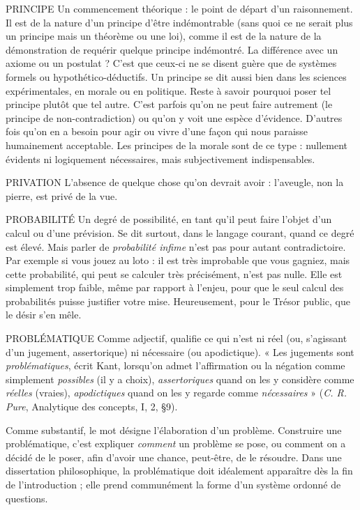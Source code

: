 PRINCIPE Un commencement théorique : le point de départ d’un raisonnement.
Il est de la nature d’un principe d’être indémontrable
(sans quoi ce ne serait plus un principe mais un théorème ou une loi), comme
il est de la nature de la démonstration de requérir quelque principe indémontré.
La différence avec un axiome ou un postulat ? C’est que ceux-ci ne se
disent guère que de systèmes formels ou hypothético-déductifs. Un principe se
dit aussi bien dans les sciences expérimentales, en morale ou en politique. Reste
à savoir pourquoi poser tel principe plutôt que tel autre. C’est parfois qu’on ne
peut faire autrement (le principe de non-contradiction) ou qu’on y voit une
espèce d’évidence. D’autres fois qu’on en a besoin pour agir ou vivre d’une
façon qui nous paraisse humainement acceptable. Les principes de la morale
sont de ce type : nullement évidents ni logiquement nécessaires, mais subjectivement
indispensables.

PRIVATION L'absence de quelque chose qu’on devrait avoir : l’aveugle,
non la pierre, est privé de la vue.

PROBABILITÉ Un degré de possibilité, en tant qu’il peut faire l’objet d’un
calcul ou d’une prévision. Se dit surtout, dans le langage
courant, quand ce degré est élevé. Mais parler de {\it probabilité infime} n’est pas
pour autant contradictoire. Par exemple si vous jouez au loto : il est très improbable
que vous gagniez, mais cette probabilité, qui peut se calculer très précisément,
n’est pas nulle. Elle est simplement trop faible, même par rapport à
l'enjeu, pour que le seul calcul des probabilités puisse justifier votre mise. Heureusement,
pour le Trésor public, que le désir s’en mêle.

PROBLÉMATIQUE Comme adjectif, qualifie ce qui n’est ni réel (ou,
s'agissant d’un jugement, assertorique) ni nécessaire
(ou apodictique). « Les jugements sont {\it problématiques}, écrit Kant, lorsqu'on
admet l’affirmation ou la négation comme simplement {\it possibles} (il y a choix),
{\it assertoriques} quand on les y considère comme {\it réelles} (vraies), {\it apodictiques} quand
on les y regarde comme {\it nécessaires} » ({\it C. R. Pure}, Analytique des concepts, I, 2,
\S 9).

Comme substantif, le mot désigne l'élaboration d’un problème. Construire
une problématique, c’est expliquer {\it comment} un problème se pose, ou comment
on a décidé de le poser, afin d’avoir une chance, peut-être, de le résoudre. Dans
une dissertation philosophique, la problématique doit idéalement apparaître
dès la fin de l’introduction ; elle prend communément la forme d’un système
ordonné de questions.

